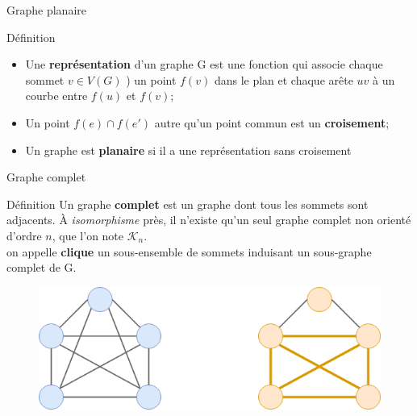 \documentclass[10pt,xcolor=dvipsnames]{beamer}
\newcommand{\defin}[1]{\textcolor{darkspringgreen}{#1}}
\begin{document}
\begin{frame}{Graphe planaire}
    \begin{exampleblock}{Définition}
            \begin{itemize}[<+->]
                \item Une \defin{\textbf{représentation}} d'un graphe G est une fonction qui associe chaque sommet $v \in V(G)$ ) un point $f(v)$ dans le plan et chaque  arête $u v$ à un courbe entre $f(u)$ et $f(v)$;
                \item Un point $f(e) \cap f(e')$ autre qu'un point commun est un \textbf{\defin{croisement}};
                \item Un graphe est \defin{\textbf{planaire}} si il a une \defin{représentation} sans \defin{croisement}
            \end{itemize}
    \end{exampleblock}
\end{frame}

\begin{frame}{Graphe complet}
    \begin{exampleblock}{Définition}
            Un graphe \textbf{\defin{complet}} est un graphe dont tous les sommets sont \defin{adjacents}. À \textit{isomorphisme} près, il n'existe qu'un seul graphe \defin{complet} non orienté d'ordre $n$, que l'on note $\mathcal{K}_n$.\\
            
            on appelle \defin{\textbf{clique}} un sous-ensemble de sommets induisant un sous-graphe complet de G.
    \end{exampleblock}
    
    \begin{figure}
        \centering
        \includegraphics[scale=0.5]{figures/CM3/complete-graph.png}
        \label{fig:my_label}
    \end{figure}
\end{frame}
\end{document}
